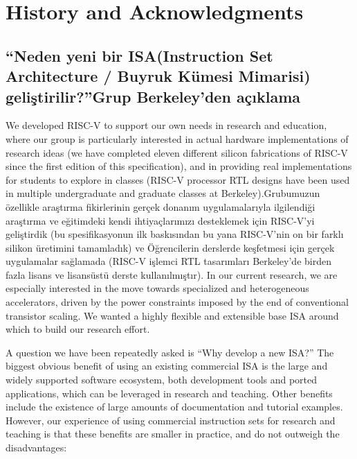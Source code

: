 \chapter{History and Acknowledgments}
\label{history}

\section{``Neden yeni bir ISA(Instruction Set Architecture / Buyruk Kümesi Mimarisi) geliştirilir?''Grup Berkeley'den açıklama}

We developed RISC-V to support our own needs in research and
education, where our group is particularly interested in actual
hardware implementations of research ideas (we have completed eleven
different silicon fabrications of RISC-V since the first edition of
this specification), and in providing real implementations for
students to explore in classes (RISC-V processor RTL designs have been
used in multiple undergraduate and graduate classes at Berkeley).Grubumuzun özellikle araştırma fikirlerinin gerçek donanım uygulamalarıyla ilgilendiği araştırma ve eğitimdeki kendi ihtiyaçlarımızı desteklemek için RISC-V'yi geliştirdik (bu spesifikasyonun ilk baskısından bu yana RISC-V'nin on bir farklı silikon üretimini tamamladık) ve Öğrencilerin derslerde keşfetmesi için gerçek uygulamalar sağlamada (RISC-V işlemci RTL tasarımları Berkeley'de birden fazla lisans ve lisansüstü derste kullanılmıştır).
In our current research, we are especially interested in the move towards
specialized and heterogeneous accelerators, driven by the power
constraints imposed by the end of conventional transistor scaling.  We
wanted a highly flexible and extensible base ISA around which to build
our research effort.

A question we have been repeatedly asked is ``Why develop a new ISA?''
The biggest obvious benefit of using an existing commercial ISA is the
large and widely supported software ecosystem, both development tools
and ported applications, which can be leveraged in research and
teaching.  Other benefits include the existence of large amounts of
documentation and tutorial examples.  However, our experience of using
commercial instruction sets for research and teaching is that these
benefits are smaller in practice, and do not outweigh the
disadvantages:

